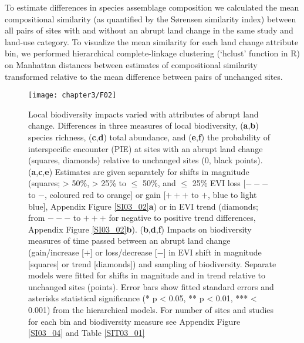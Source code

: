 To estimate differences in species assemblage composition we calculated the mean compositional similarity (as quantified by the S\o rensen similarity index) between all pairs of sites with and without an abrupt land change in the same study and land-use category. To visualize the mean similarity for each land change attribute bin, we performed hierarchical complete-linkage clustering (‘hclust’ function in R) on Manhattan distances between estimates of compositional similarity transformed relative to the mean difference between pairs of unchanged sites.

\begin{figure}[!htb]
\centering
\texttt{[image: chapter3/F02]}
\caption{Local biodiversity impacts varied with attributes of abrupt land change. Differences in three measures of local biodiversity, (\textbf{a},\textbf{b}) species richness, (\textbf{c},\textbf{d}) total abundance, and (\textbf{e},\textbf{f}) the probability of interspecific encounter (PIE) at sites with an abrupt land change (squares, diamonds) relative to unchanged sites (0, black points). (\textbf{a},\textbf{c},\textbf{e}) Estimates are given separately for shifts in magnitude (squares; > 50\%, > 25\% to $\leq$ 50\%, and $\leq$ 25\% EVI loss [$---$ to $-$, coloured red to orange] or gain [$+++$ to $+$, blue to light blue], Appendix Figure \ref{SI03_02}\textbf{a}) or in EVI trend (diamonds; from $---$ to $+++$ for negative to positive trend differences, Appendix Figure \ref{SI03_02}\textbf{b}). (\textbf{b},\textbf{d},\textbf{f}) Impacts on biodiversity measures of time passed between an abrupt land change (gain/increase [$+$] or loss/decrease [$-$] in EVI shift in magnitude [squares] or trend [diamonds]) and sampling of biodiversity. Separate models were fitted for shifts in magnitude and in trend relative to unchanged sites (points). Error bars show fitted standard errors and asterisks statistical significance (* p < 0.05, ** p < 0.01, *** < 0.001) from the hierarchical models. For number of sites and studies for each bin and biodiversity measure see Appendix Figure \ref{SI03_04} and Table \ref{SIT03_01}}
\label{F03_02}
\end{figure}


